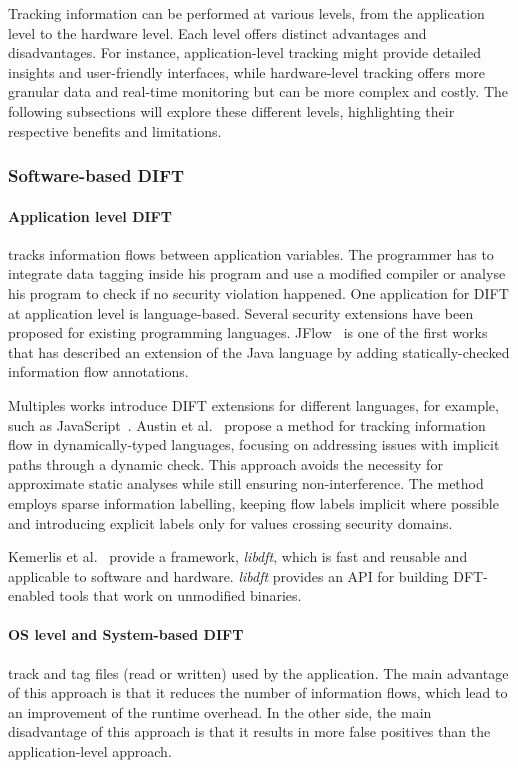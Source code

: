 Tracking information can be performed at various levels, from the application level to the hardware level. Each level offers distinct advantages and disadvantages.
For instance, application-level tracking might provide detailed insights and user-friendly interfaces, while hardware-level tracking offers more granular data and real-time monitoring but can be more complex and costly.
The following subsections will explore these different levels, highlighting their respective benefits and limitations.


\subsubsection{Software-based DIFT}
\paragraph{Application level DIFT} tracks information flows between application variables. The programmer has to integrate data tagging inside his program and use a modified compiler or analyse his program to check if no security violation happened.
One application for DIFT at application level is language-based. Several security extensions have been proposed for existing programming languages.
JFlow~\cite{M-99-popl} is one of the first works that has described an extension of the Java language by adding statically-checked information flow annotations.

Multiples works introduce DIFT extensions for different languages, for example, such as JavaScript~\cite{CN-15-ccs, AF-09-plas}.
Austin et al.~\cite{AF-09-plas} propose a method for tracking information flow in dynamically-typed languages, focusing on addressing issues with implicit paths through a dynamic check. This approach avoids the necessity for approximate static analyses while still ensuring non-interference. The method employs sparse information labelling, keeping flow labels implicit where possible and introducing explicit labels only for values crossing security domains.

Kemerlis et al.~\cite{KPJK-12-sigplan} provide a framework, \textit{libdft}, which is fast and reusable and applicable to software and hardware. \textit{libdft} provides an API for building DFT-enabled tools that work on unmodified binaries.

\paragraph{OS level and System-based DIFT} track and tag files (read or written) used by the application.
The main advantage of this approach is that it reduces the number of information flows, which lead to an improvement of the runtime overhead. In the other side, the main disadvantage of this approach is that it results in more false positives than the application-level approach.

